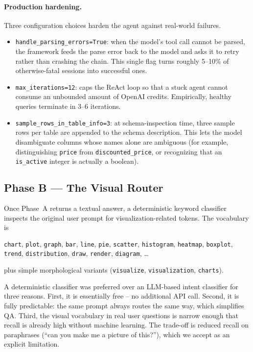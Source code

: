 \documentclass[11pt,a4paper]{article}
\begin{document}
\paragraph{Production hardening.} Three configuration choices harden
the agent against real-world failures.
\begin{itemize}
  \item \texttt{handle\_parsing\_errors=True}: when the model's tool
        call cannot be parsed, the framework feeds the parse error back
        to the model and asks it to retry rather than crashing the
        chain. This single flag turns roughly 5--10\% of otherwise-fatal
        sessions into successful ones.
  \item \texttt{max\_iterations=12}: caps the ReAct loop so that a
        stuck agent cannot consume an unbounded amount of OpenAI
        credits. Empirically, healthy queries terminate in 3--6
        iterations.
  \item \texttt{sample\_rows\_in\_table\_info=3}: at schema-inspection
        time, three sample rows per table are appended to the schema
        description. This lets the model disambiguate columns whose
        names alone are ambiguous (for example, distinguishing
        \texttt{price} from \texttt{discounted\_price}, or recognizing
        that an \texttt{is\_active} integer is actually a boolean).
\end{itemize}

\subsection{Phase B --- The Visual Router}

Once Phase~A returns a textual answer, a deterministic keyword
classifier inspects the original user prompt for visualization-related
tokens. The vocabulary is
\begin{center}
\texttt{chart}, \texttt{plot}, \texttt{graph}, \texttt{bar},
\texttt{line}, \texttt{pie}, \texttt{scatter}, \texttt{histogram},
\texttt{heatmap}, \texttt{boxplot}, \texttt{trend},
\texttt{distribution}, \texttt{draw}, \texttt{render},
\texttt{diagram}, \ldots
\end{center}
plus simple morphological variants (\texttt{visualize},
\texttt{visualization}, \texttt{charts}).

A deterministic classifier was preferred over an LLM-based intent
classifier for three reasons. First, it is essentially free -- no
additional API call. Second, it is fully predictable: the same prompt
always routes the same way, which simplifies QA. Third, the visual
vocabulary in real user questions is narrow enough that recall is
already high without machine learning. The trade-off is reduced
recall on paraphrases (``can you make me a picture of this?''), which
we accept as an explicit limitation.
\end{document}

